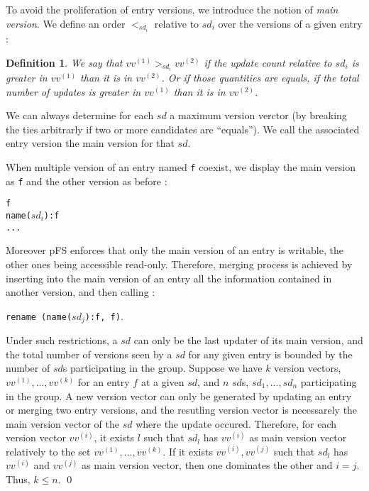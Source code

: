 \documentclass[letterpaper,twocolumn,10pt]{article}
\newtheorem{definition}{Definition}
\begin{document}
To avoid the proliferation of entry versions, we introduce the notion
of \emph{main version}. We define an order $<_{sd_{i}}$ relative to
$sd_{i}$ over the versions of a given entry :

\begin{definition}
We say that $vv^{(1)} >_{sd_{i}} vv^{(2)}$ if the update count
relative to $sd_{i}$ is greater in $vv^{(1)}$ than it is in
$vv^{(2)}$. Or if those quantities are equals, if the total number
of updates is greater in $vv^{(1)}$ than it is in $vv^{(2)}$.
\end{definition}
 
We can always determine for each $sd$ a maximum version verctor (by
breaking the ties arbitrarly if two or more candidates are
``equals''). We call the associated entry version the main version for
that $sd$.

When multiple version of an entry named {\tt f} coexist, we display
the main version as {\tt f} and the other version as before :
\begin{center}
  {\tt f} \\
  {\tt name($sd_{i}$):f} \\
  {\tt ...}
\end{center}
Moreover pFS enforces that only the main version of an entry is
writable, the other ones being accessible read-only.
Therefore, merging process is achieved by inserting into the main
version of an entry all the information contained in another version,
and then calling :
\begin{center}
{\tt rename (name($sd_{j}$):f, f)}.
\end{center}
Under such restrictions, a $sd$ can only be the last updater of its
main version, and the total number of versions seen by a $sd$ for any
given entry is bounded by the number of $sd$s participating in the group.
{\proof
Suppose we have $k$ version vectors, $vv^{(1)},..., vv^{(k)}$ for an
entry $f$ at a given $sd$, and $n$ $sd$s, $sd_{1}, ..., sd_{n}$
participating in the group. A new version vector can only be generated
by updating an entry or merging two entry versions, and the resutling
version vector is necessarely the main version vector of the $sd$
where the update occured. Therefore, for each version vector
$vv^{(i)}$, it exists $l$ such that $sd_{l}$ has $vv^{(i)}$ as main
version vector relatively to the set $vv^{(1)},..., vv^{(k)}$. If it
exists $vv^{(i)},vv^{(j)}$ such that $sd_{l}$ has $vv^{(i)}$ and
$vv^{(j)}$ as main version vector, then one dominates the other and
$i=j$. Thus, $k \leq n$. \qed
}
\end{document}
